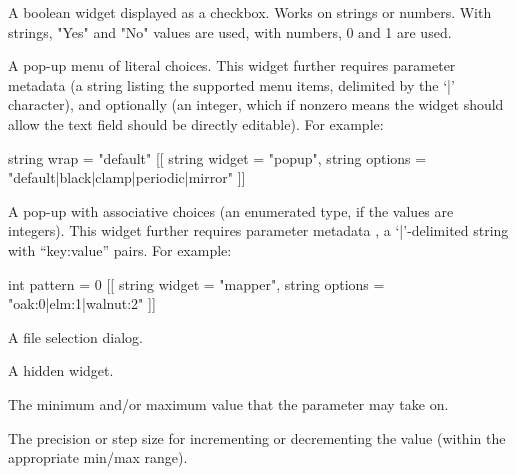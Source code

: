 \documentclass[11pt,letterpaper]{book}
\begin{document}
\vspace{12pt}
A boolean widget displayed as a checkbox. Works on strings or
numbers. With strings, "Yes" and "No" values are used, with numbers,
0 and 1 are used.
\apiend
\vspace{-12pt}

\vspace{12pt}
A pop-up menu of literal choices. This widget further requires
parameter metadata  (a string listing the supported
menu items, delimited by the `{\cf |}' character), and optionally 
(an integer, which if nonzero means the widget should allow the
text field should be directly editable).  For example:
\begin{code}
    string wrap = "default"
        [[ string widget = "popup",
           string options = "default|black|clamp|periodic|mirror" ]]
\end{code}
\apiend
\vspace{-16pt}

\vspace{12pt}
A pop-up with associative choices (an enumerated type, if the values
are integers).  This widget further requires
parameter metadata , a `{\cf |}'-delimited string with
``key:value'' pairs.  For example:
\begin{code}
    int pattern = 0
        [[ string widget = "mapper",
           string options = "oak:0|elm:1|walnut:2" ]]
\end{code}
\apiend
\vspace{-16pt}

\vspace{12pt}
A file selection dialog.
\apiend
\vspace{-16pt}

\vspace{12pt}
A hidden widget.
\apiend
\vspace{-16pt}

\apiend

The minimum and/or maximum value that the parameter may take on.
\apiend

The precision or step size for incrementing or decrementing the value
(within the appropriate min/max range).
\apiend
\end{document}
